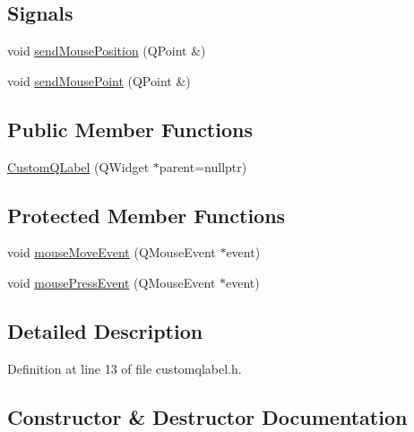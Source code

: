 \subsection*{Signals}
\begin{DoxyCompactItemize}
\item 
void \mbox{\hyperlink{class_custom_q_label_ac07a9c61c0ac4df046b70cbec46e1af5}{send\+Mouse\+Position}} (Q\+Point \&)
\item 
void \mbox{\hyperlink{class_custom_q_label_a7d4eb54a2a007c20a19dd5f7fac50af4}{send\+Mouse\+Point}} (Q\+Point \&)
\end{DoxyCompactItemize}
\subsection*{Public Member Functions}
\begin{DoxyCompactItemize}
\item 
\mbox{\hyperlink{class_custom_q_label_ac856b3704cbe770fd195ec7d02a472c9}{Custom\+Q\+Label}} (Q\+Widget $\ast$parent=nullptr)
\end{DoxyCompactItemize}
\subsection*{Protected Member Functions}
\begin{DoxyCompactItemize}
\item 
void \mbox{\hyperlink{class_custom_q_label_ad38c1fd51481999bb650c6a38dfc7e36}{mouse\+Move\+Event}} (Q\+Mouse\+Event $\ast$event)
\item 
void \mbox{\hyperlink{class_custom_q_label_abceeb9e01468b1797bff7e93978cbb55}{mouse\+Press\+Event}} (Q\+Mouse\+Event $\ast$event)
\end{DoxyCompactItemize}


\subsection{Detailed Description}


Definition at line 13 of file customqlabel.\+h.



\subsection{Constructor \& Destructor Documentation}
\mbox{\label{class_custom_q_label_ac856b3704cbe770fd195ec7d02a472c9}} 
